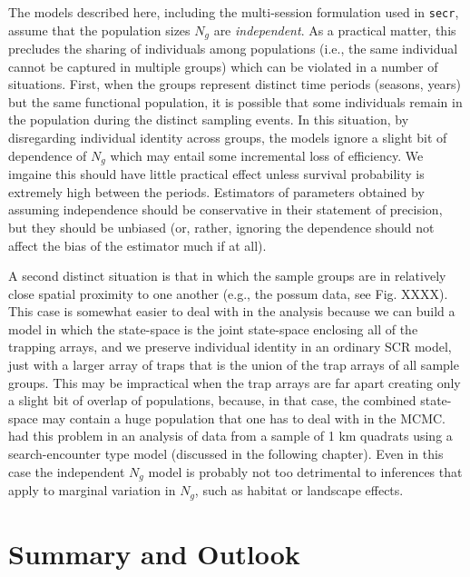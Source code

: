 The models described here, including the multi-session formulation
used in \mbox{\tt secr}, assume that the population sizes $N_{g}$ are
{\it independent}. As a practical matter, this precludes the sharing
of individuals among populations (i.e., the same individual cannot be
captured in multiple groups) which can be violated in a number of situations.
First, when the groups represent distinct time periods (seasons,
years) but the same functional population, it is possible that some
individuals remain in the population during the distinct sampling events.
In this situation, by disregarding individual identity across groups, the models ignore
a slight bit of 
dependence of $N_{g}$ which may entail some incremental 
 loss of efficiency. We imgaine this should
 have little practical  effect unless survival probability is
 extremely high between the periods.  Estimators of parameters obtained
 by assuming independence should be conservative in their statement of
 precision, but they should be unbiased (or, rather, 
 ignoring the dependence should not affect the bias of the estimator
 much if at all).

A second distinct situation is that in which the sample groups are in 
relatively close spatial proximity to one another (e.g., the possum
data, see Fig. XXXX). This case is somewhat easier to deal with in the
analysis because we can build a model in which the state-space is the
joint state-space enclosing all of the trapping arrays, and we
preserve individual identity in an ordinary SCR model, just with
a larger array of traps that is the union of the trap arrays of all
sample groups. This may be impractical when the trap arrays are far
apart creating only a slight bit of overlap of populations, because,
in that case, the combined state-space may contain a huge population
that one has to deal with in the MCMC.  \citep{royle_etal:2011mee} had
this problem in an analysis of data from a sample of 1 km quadrats
using a search-encounter type model (discussed in the following
chapter).
Even in this case the independent $N_{g}$ model is probably not too
detrimental to inferences that apply to marginal variation in $N_{g}$,
such as habitat or landscape effects. 









\section{Summary and Outlook}

